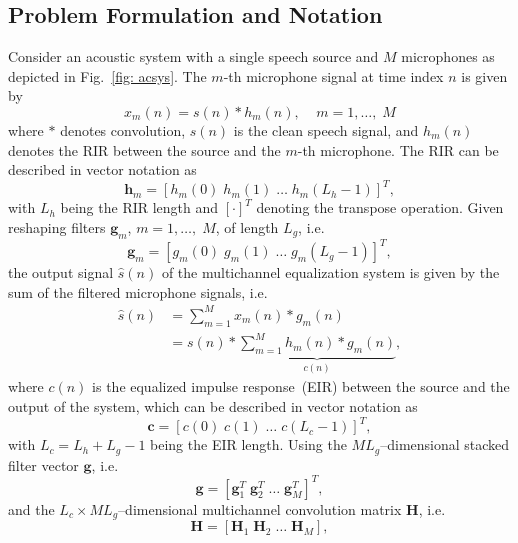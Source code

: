 \documentclass[draftcls,onecolumn,11pt]{IEEEtran}
\begin{document}
\subsection{Problem Formulation and Notation}
\label{subsec: prob}
Consider an acoustic system with a single speech source and $M$ microphones as depicted in Fig.~\ref{fig: acsys}.
The $m$-th microphone signal at time index $n$ is given by
\begin{equation}
  x_m(n) =  s(n)  \ast h_m(n), \; \; \; \; m = 1, \ldots, \; M
\end{equation}
where $\ast$ denotes convolution, $s(n)$ is the clean speech signal, and $h_m(n)$ denotes the RIR between the source and the $m$-th microphone.
The RIR can be described in vector notation as
\begin{equation}
  \mathbf{h}_m = \left[h_m(0) \; h_m(1) \; \ldots \; h_m(L_h-1) \right]^T,
\end{equation}
with $L_h$ being the RIR length and $\left[\cdot \right]^T$ denoting the transpose operation.
Given reshaping filters $\mathbf{g}_m$, $m = 1, \ldots, \; M$, of length $L_g$, i.e.
\begin{equation}
\mathbf{g}_m = \left[g_m(0) \; g_m(1) \; \ldots \; g_m(L_g-1) \right]^T,
\end{equation}
the output signal $\hat{s}(n)$ of the multichannel equalization system is given by the sum of the filtered microphone signals, i.e.
\begin{align}
  \hat{s}(n) &= \sum_{m=1}^{M} x_m(n) \ast g_m(n) \\
  & =  s(n) \ast \underbrace{\sum_{m=1}^{M} h_m(n) \ast g_m(n)}_{c(n)},
\end{align}
where $c(n)$ is the equalized impulse response~(EIR) between the source and the output of the system, which can be described in vector notation as
\begin{equation}
\mathbf{c} = \left[c(0) \; c(1) \; \ldots \; c(L_c-1) \right]^{T},
\end{equation}
with $L_c = L_h+L_g-1$ being the EIR length.
Using the $ML_g$--dimensional stacked filter vector $\mathbf{g}$, i.e.
\begin{equation}
  \mathbf{g}  =  \left[\mathbf{g}_1^T \; \mathbf{g}_2^T \; \ldots \; \mathbf{g}_M^T \right]^T,
\end{equation}
 and the $L_c \times ML_g$--dimensional multichannel convolution matrix $\mathbf{H}$, i.e.
\begin{equation}
\mathbf{H}  = \left[\mathbf{H}_1 \; \mathbf{H}_2 \; \ldots \; \mathbf{H}_M \right],
\end{equation}
\end{document}
